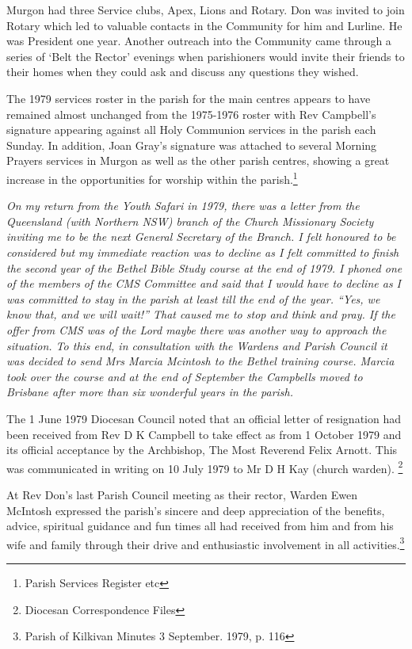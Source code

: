 Murgon had three Service clubs, Apex, Lions and Rotary. Don was invited to join Rotary which led to valuable contacts in the Community for him and Lurline. He was President one year. Another outreach into the Community came through a series of `Belt the Rector' evenings when parishioners would invite their friends to their homes when they could ask and discuss any questions they wished.

The 1979 services roster in the parish for the main centres appears to have remained almost unchanged from the 1975-1976 roster with Rev Campbell's signature appearing against all Holy Communion services in the parish each Sunday. In addition, Joan Gray's signature was attached to several Morning Prayers services in Murgon as well as the other parish centres, showing a great increase in the opportunities for worship within the parish.\footnote{Parish Services Register etc}

\emph{On my return from the Youth Safari in 1979, there was a letter from the Queensland (with Northern NSW) branch of the Church Missionary Society inviting me to be the next General Secretary of the Branch. I felt honoured to be considered but my immediate reaction was to decline as I felt committed to finish the second year of the Bethel Bible Study course at the end of 1979. I phoned one of the members of the CMS Committee and said that I would have to decline as I was committed to stay in the parish at least till the end of the year. ``Yes, we know that, and we will wait!'' That caused me to stop and think and pray. If the offer from CMS was of the Lord maybe there was another way to approach the situation. To this end, in consultation with the Wardens and Parish Council it was decided to send Mrs Marcia Mcintosh to the Bethel training course. Marcia took over the course and at the end of September the Campbells moved to Brisbane after more than six wonderful years in the parish.}

The 1 June 1979 Diocesan Council noted that an official letter of resignation had been received from Rev D K Campbell to take effect as from 1 October 1979 and its official acceptance by the Archbishop, The Most Reverend Felix Arnott. This was communicated in writing on 10 July 1979 to Mr D H Kay (church warden). \footnote{Diocesan Correspondence Files}

At Rev Don's last Parish Council meeting as their rector, Warden Ewen McIntosh expressed the parish's sincere and deep appreciation of the benefits, advice, spiritual guidance and fun times all had received from him and from his wife and family through their drive and enthusiastic involvement in all activities.\footnote{Parish of Kilkivan Minutes 3 September. 1979, p. 116}

